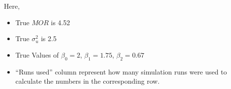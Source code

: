 \documentclass[
  letterpaper,
  DIV=11,
  numbers=noendperiod,
  titlepage]{scrartcl}
\providecommand{\tightlist}{%
  \setlength{\itemsep}{0pt}\setlength{\parskip}{0pt}}\usepackage{longtable,booktabs,array}
\begin{document}
\endgroup

\vspace{10mm}

Here,

\begin{itemize}
\tightlist
\item
  True \(MOR\) is 4.52
\item
  True \(\sigma^2_u\) is 2.5
\item
  True Values of \(\beta_0 = 2\), \(\beta_1 = 1.75\), \(\beta_2 = 0.67\)
\item
  ``Runs used'' column represent how many simulation runs were used to
  calculate the numbers in the corresponding row.
\end{itemize}
\end{document}
